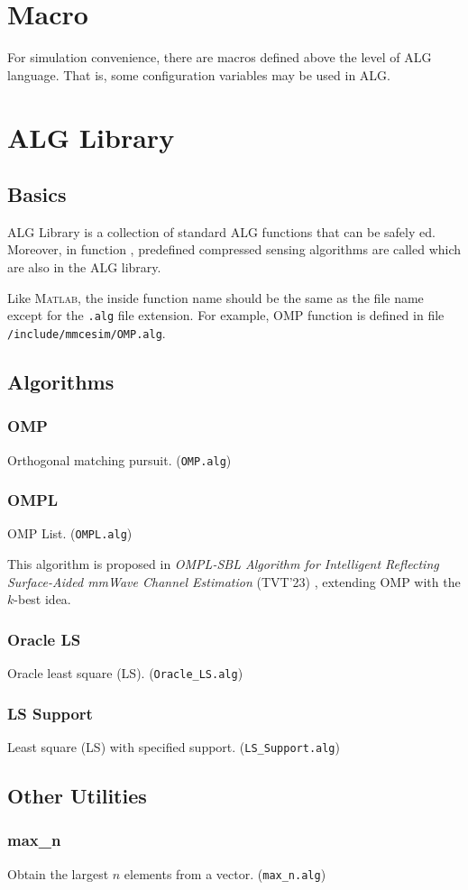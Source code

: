 \section{Macro}\label{d:sec:macro}
For simulation convenience,
there are macros defined above the level of ALG language.
That is, some configuration variables may be used in ALG.

\section{ALG Library}\label{d:sec:alg_lib}

\subsection{Basics}

ALG Library is a collection of standard ALG functions that can be safely ed.
Moreover, in function , predefined compressed sensing algorithms are called which are also in the ALG library.

Like \textsc{Matlab}, the inside function name should be the same as the file name except for the \texttt{.alg} file extension.
For example, OMP function is defined in file \texttt{/include/mmcesim/OMP.alg}.

\subsection{Algorithms}

\subsubsection{OMP}
Orthogonal matching pursuit. (\texttt{OMP.alg})

\subsubsection{OMPL}
OMP List. (\texttt{OMPL.alg})

This algorithm is proposed in \textit{OMPL-SBL Algorithm for Intelligent Reflecting Surface-Aided mmWave Channel Estimation} (TVT'23) \cite{zhao2023ompl},
extending OMP with the $k$-best idea.

\subsubsection{Oracle LS}
Oracle least square (LS). (\texttt{Oracle\_LS.alg})

\subsubsection{LS Support}
Least square (LS) with specified support. (\texttt{LS\_Support.alg})

\subsection{Other Utilities}

\subsubsection{max\_n}
Obtain the largest $n$ elements from a vector. (\texttt{max\_n.alg})
